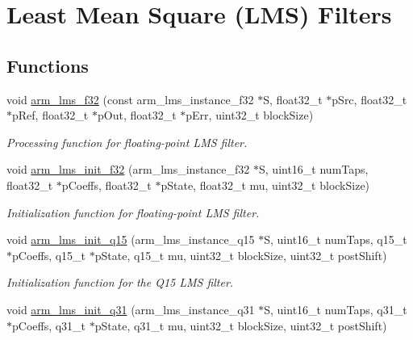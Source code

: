 \hypertarget{group__LMS}{}\section{Least Mean Square (L\+MS) Filters}
\label{group__LMS}
\subsection*{Functions}
\begin{DoxyCompactItemize}
\item 
void \hyperlink{group__LMS_gae266d009e682180421601627c79a3843}{arm\+\_\+lms\+\_\+f32} (const arm\+\_\+lms\+\_\+instance\+\_\+f32 $\ast$S, float32\+\_\+t $\ast$p\+Src, float32\+\_\+t $\ast$p\+Ref, float32\+\_\+t $\ast$p\+Out, float32\+\_\+t $\ast$p\+Err, uint32\+\_\+t block\+Size)
\begin{DoxyCompactList}\small\item\em Processing function for floating-\/point L\+MS filter. \end{DoxyCompactList}\item 
void \hyperlink{group__LMS_ga9fc7adca0966ff2cec1746fca8364cee}{arm\+\_\+lms\+\_\+init\+\_\+f32} (arm\+\_\+lms\+\_\+instance\+\_\+f32 $\ast$S, uint16\+\_\+t num\+Taps, float32\+\_\+t $\ast$p\+Coeffs, float32\+\_\+t $\ast$p\+State, float32\+\_\+t mu, uint32\+\_\+t block\+Size)
\begin{DoxyCompactList}\small\item\em Initialization function for floating-\/point L\+MS filter. \end{DoxyCompactList}\item 
void \hyperlink{group__LMS_ga9544cc26f18cd4465cfbed371be822b3}{arm\+\_\+lms\+\_\+init\+\_\+q15} (arm\+\_\+lms\+\_\+instance\+\_\+q15 $\ast$S, uint16\+\_\+t num\+Taps, q15\+\_\+t $\ast$p\+Coeffs, q15\+\_\+t $\ast$p\+State, q15\+\_\+t mu, uint32\+\_\+t block\+Size, uint32\+\_\+t post\+Shift)
\begin{DoxyCompactList}\small\item\em Initialization function for the Q15 L\+MS filter. \end{DoxyCompactList}\item 
void \hyperlink{group__LMS_ga8d4bc251169f4b102355097a9f7530d6}{arm\+\_\+lms\+\_\+init\+\_\+q31} (arm\+\_\+lms\+\_\+instance\+\_\+q31 $\ast$S, uint16\+\_\+t num\+Taps, q31\+\_\+t $\ast$p\+Coeffs, q31\+\_\+t $\ast$p\+State, q31\+\_\+t mu, uint32\+\_\+t block\+Size, uint32\+\_\+t post\+Shift)

\end{DoxyCompactItemize}
